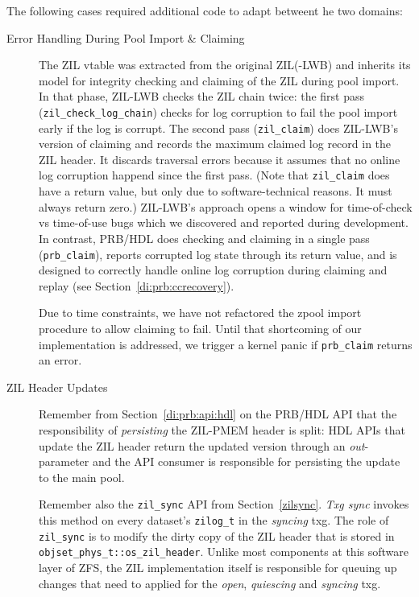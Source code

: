 \documentclass[12pt,a4paper,twoside]{book}
\begin{document}
The following cases required additional code to adapt betweent he two domains:
\begin{description}
    \item[Error Handling During Pool Import \& Claiming]
        The ZIL vtable was extracted from the original ZIL(-LWB) and inherits its model for integrity checking and claiming of the ZIL during pool import.
        In that phase, ZIL-LWB checks the ZIL chain twice:
        the first pass (\lstinline{zil_check_log_chain}) checks for log corruption to fail the pool import early if the log is corrupt.
        The second pass (\lstinline{zil_claim}) does ZIL-LWB's version of claiming and records the maximum claimed log record in the ZIL header.
        It discards traversal errors because it assumes that no online log corruption happend since the first pass.
        (Note that \lstinline{zil_claim} does have a return value, but only due to software-technical reasons. It must always return zero.)
        ZIL-LWB's approach opens a window for time-of-check vs time-of-use bugs which we discovered and reported during development.
        In contrast, PRB/HDL does checking and claiming in a single pass (\lstinline{prb_claim}), reports corrupted log state through its return value, and is designed to correctly handle online log corruption during claiming and replay (see Section~\ref{di:prb:ccrecovery}).

        Due to time constraints, we have not refactored the zpool import procedure to allow claiming to fail.
        Until that shortcoming of our implementation is addressed, we trigger a kernel panic if \lstinline{prb_claim} returns an error.

    \item[ZIL Header Updates]
        Remember from Section~\ref{di:prb:api:hdl} on the PRB/HDL API that the responsibility of \textit{persisting} the ZIL-PMEM header is split:
        HDL APIs that update the ZIL header return the updated version through an \textit{out}-parameter and the API consumer is responsible for persisting the update to the main pool.

        Remember also the \lstinline{zil_sync} API from Section~\ref{zilsync}.
        \textit{Txg sync} invokes this method on every dataset's \lstinline{zilog_t} in the \textit{syncing} txg.
        The role of \lstinline{zil_sync} is to modify the dirty copy of the ZIL header that is stored in \lstinline{objset_phys_t::os_zil_header}.
        Unlike most components at this software layer of ZFS, the ZIL implementation itself is responsible for queuing up changes that need to applied for the \textit{open}, \textit{quiescing} and \textit{syncing} txg.


\end{description}
\end{document}
